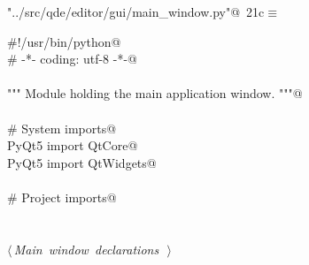 \documentclass[
    a4paper,      %
    10pt,         %
    openright,    %
    notitlepage,  %
    parskip=half, %
]{scrreprt}       %
\theoremstyle{definition}                    %
\begin{document}
\begin{flushleft} \small
\begin{minipage}{\linewidth}\label{scrap17}\raggedright\small
{} \verb@"../src/qde/editor/gui/main_window.py"@\nobreak\ {\footnotesize {21c}}$\equiv$
\vspace{-1ex}
\begin{list}{}{} \item
\mbox{}\lstinline@#!/usr/bin/python@\\
\mbox{}\lstinline@# -*- coding: utf-8 -*-@\\
\mbox{}\lstinline@@\\
\mbox{}\lstinline@""" Module holding the main application window. """@\\
\mbox{}\lstinline@@\\
\mbox{}\lstinline@# System imports@\\
\mbox{}\lstinline@from PyQt5 import QtCore@\\
\mbox{}\lstinline@from PyQt5 import QtWidgets@\\
\mbox{}\lstinline@@\\
\mbox{}\lstinline@# Project imports@\\
\mbox{}\lstinline@@\\
\mbox{}\lstinline@@\\
\mbox{}\lstinline@@\hbox{$\langle\,${\itshape Main window declarations}\nobreak\ {\footnotesize {}}$\,\rangle$}\lstinline@@\\
\mbox{}\lstinline@@{\NWsep}
\end{list}
\vspace{-1.5ex}
\footnotesize
\begin{list}{}{\setlength{\itemsep}{-\parsep}\setlength{\itemindent}{-\leftmargin}}

\item{}
\end{list}
\end{minipage}\vspace{4ex}
\end{flushleft}
\end{document}
